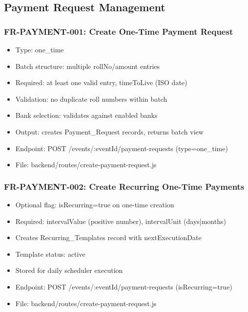 \documentclass[12pt,a4paper]{article}
\begin{document}
\subsection{Payment Request Management}

\subsubsection{FR-PAYMENT-001: Create One-Time Payment Request}
\begin{itemize}
  \item Type: one\_time
  \item Batch structure: multiple rollNo/amount entries
  \item Required: at least one valid entry, timeToLive (ISO date)
  \item Validation: no duplicate roll numbers within batch
  \item Bank selection: validates against enabled banks
  \item Output: creates Payment\_Request records, returns batch view
  \item Endpoint: POST /events/:eventId/payment-requests (type=one\_time)
  \item File: backend/routes/create-payment-request.js
\end{itemize}

\subsubsection{FR-PAYMENT-002: Create Recurring One-Time Payments}
\begin{itemize}
  \item Optional flag: isRecurring=true on one-time creation
  \item Required: intervalValue (positive number), intervalUnit (days|months)
  \item Creates Recurring\_Templates record with nextExecutionDate
  \item Template status: active
  \item Stored for daily scheduler execution
  \item Endpoint: POST /events/:eventId/payment-requests (isRecurring=true)
  \item File: backend/routes/create-payment-request.js
\end{itemize}
\end{document}

